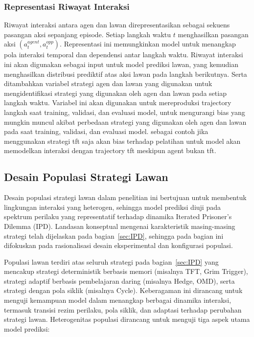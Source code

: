 \subsubsection{Representasi Riwayat Interaksi}
Riwayat interaksi antara agen dan lawan direpresentasikan sebagai sekuens pasangan aksi sepanjang episode. Setiap langkah waktu $t$ menghasilkan pasangan aksi $(a_t^{agent}, a_t^{opp})$. Representasi ini memungkinkan model untuk menangkap pola interaksi temporal dan dependensi antar langkah waktu. Riwayat interaksi ini akan digunakan sebagai input untuk model prediksi lawan, yang kemudian menghasilkan distribusi prediktif atas aksi lawan pada langkah berikutnya. Serta ditambahkan variabel strategi agen dan lawan yang digunakan untuk mengidentifikasi strategi yang digunakan oleh agen dan lawan pada setiap langkah waktu. Variabel ini akan digunakan untuk mereproduksi trajectory langkah saat training, validasi, dan evaluasi model, untuk mengurangi bias yang mungkin muncul akibat perbedaan strategi yang digunakan oleh agen dan lawan pada saat training, validasi, dan evaluasi model. sebagai contoh jika menggunakan strategi tft saja akan bias terhadap pelatihan untuk model akan memodelkan interaksi dengan trajectory tft meskipun agent bukan tft.

\subsection{Desain Populasi Strategi Lawan}\label{sec:PopulasiStrategi}

Desain populasi strategi lawan dalam penelitian ini bertujuan untuk membentuk lingkungan interaksi yang heterogen, sehingga model prediksi diuji pada spektrum perilaku yang representatif terhadap dinamika Iterated Prisoner's Dilemma (IPD). Landasan konseptual mengenai karakteristik masing-masing strategi telah dijelaskan pada bagian~\ref{sec:IPD}, sehingga pada bagian ini difokuskan pada rasionalisasi desain eksperimental dan konfigurasi populasi.

Populasi lawan terdiri atas seluruh strategi pada bagian~\ref{sec:IPD} yang mencakup strategi deterministik berbasis memori (misalnya TFT, Grim Trigger), strategi adaptif berbasis pembelajaran daring (misalnya Hedge, OMD), serta strategi dengan pola siklik (misalnya Cycle). Keberagaman ini dirancang untuk menguji kemampuan model dalam menangkap berbagai dinamika interaksi, termasuk transisi rezim perilaku, pola siklik, dan adaptasi terhadap perubahan strategi lawan. Heterogenitas populasi dirancang untuk menguji tiga aspek utama model prediksi:

